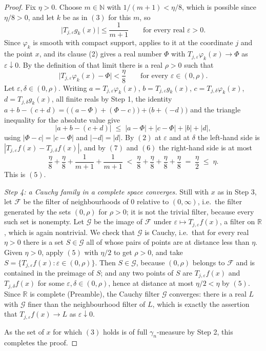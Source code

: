 \begin{proof}
Fix $\eta > 0$.  Choose $m \in \mathbb{N}$ with $1/(m+1) < \eta/8$, which is
possible since $\eta/8 > 0$, and let $k$ be as in $(3)$ for this $m$, so
\begin{equation*}
  \bigl|T_{j,\varepsilon}g_k(x)\bigr| \leq \frac1{m+1}
  \qquad\text{for every real }\varepsilon > 0 . \tag{6}
\end{equation*}
Since $\varphi_k$ is smooth with compact support, 
applies to it at the coordinate $j$ and the point $x$, and its clause (2) gives
a real number $\Phi$ with
$T_{j,\varepsilon}\varphi_k(x) \to \Phi$ as $\varepsilon \downarrow 0$.  By the
definition of that limit there is a real $\rho > 0$ such that
\begin{equation*}
  \bigl|T_{j,\varepsilon}\varphi_k(x) - \Phi\bigr| < \frac\eta8
  \qquad\text{for every }\varepsilon \in (0,\rho) . \tag{7}
\end{equation*}
Let $\varepsilon,\delta \in (0,\rho)$.  Writing
$a = T_{j,\varepsilon}\varphi_k(x)$, $b = T_{j,\varepsilon}g_k(x)$,
$c = T_{j,\delta}\varphi_k(x)$, $d = T_{j,\delta}g_k(x)$, all finite reals by
Step 1, the identity
$a + b - (c+d) = \bigl((a-\Phi) + (\Phi-c)\bigr) + \bigl(b + (-d)\bigr)$ and
the triangle inequality for the absolute value give
\[
  |a + b - (c+d)| \;\leq\; |a-\Phi| + |c-\Phi| + |b| + |d| ,
\]
using $|\Phi - c| = |c - \Phi|$ and $|-d| = |d|$.  By $(2)$ at $\varepsilon$
and at $\delta$ the left-hand side is
$|T_{j,\varepsilon}f(x) - T_{j,\delta}f(x)|$, and by $(7)$ and $(6)$ the
right-hand side is at most
\[
  \frac\eta8 + \frac\eta8 + \frac1{m+1} + \frac1{m+1}
  \;<\; \frac\eta8 + \frac\eta8 + \frac\eta8 + \frac\eta8
  \;=\; \frac\eta2 \;\leq\; \eta .
\]
This is $(5)$.

\emph{Step 4: a Cauchy family in a complete space converges.}
Still with $x$ as in Step 3, let $\mathcal{F}$ be the filter of
neighbourhoods of $0$ relative to $(0,\infty)$, i.e.\ the filter generated by
the sets $(0,\rho)$ for $\rho > 0$; it is not the trivial filter, because every
such set is nonempty.  Let $\mathcal{G}$ be the image of $\mathcal{F}$ under
$\varepsilon \mapsto T_{j,\varepsilon}f(x)$, a filter on $\mathbb{R}$, which is
again nontrivial.  We check that $\mathcal{G}$ is Cauchy, i.e.\ that for every
real $\eta > 0$ there is a set $S \in \mathcal{G}$ all of whose pairs of points
are at distance less than $\eta$.  Given $\eta > 0$, apply $(5)$ with $\eta/2$
to get $\rho > 0$, and take
$S = \{T_{j,\varepsilon}f(x) : \varepsilon \in (0,\rho)\}$.  Then
$S \in \mathcal{G}$, because $(0,\rho)$ belongs to $\mathcal{F}$ and is
contained in the preimage of $S$; and any two points of $S$ are
$T_{j,\varepsilon}f(x)$ and $T_{j,\delta}f(x)$ for some
$\varepsilon,\delta \in (0,\rho)$, hence at distance at most $\eta/2 < \eta$ by
$(5)$.  Since $\mathbb{R}$ is complete (Preamble), the Cauchy filter
$\mathcal{G}$ converges: there is a real $L$ with $\mathcal{G}$ finer than the
neighbourhood filter of $L$, which is exactly the assertion that
$T_{j,\varepsilon}f(x) \to L$ as $\varepsilon \downarrow 0$.

As the set of $x$ for which $(3)$ holds is of full $\gamma_n$-measure by Step 2,
this completes the proof.
\end{proof}
